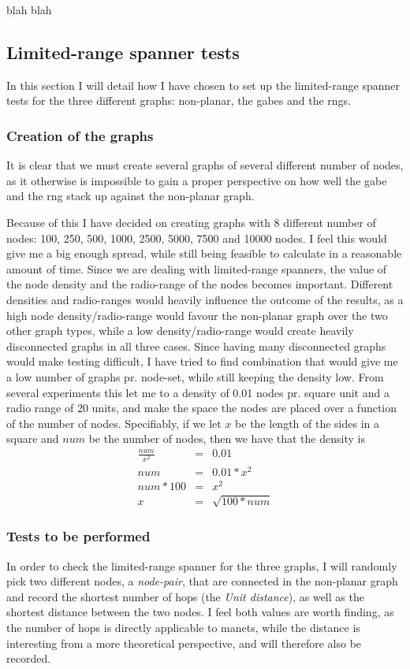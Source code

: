 blah blah



\subsection{Limited-range spanner tests}
\label{section:test_desc_spanners}
In this section I will detail how I have chosen to set up the limited-range spanner tests for the three different graphs: non-planar, the \acp{gabe} and the \acp{rng}.

\subsubsection{Creation of the graphs}
It is clear that we must create several graphs of several different number of nodes, as it otherwise is impossible to gain a proper perspective on how well the \ac{gabe} and the \ac{rng} stack up against the non-planar graph.

Because of this I have decided on creating graphs with 8 different number of nodes: 100, 250, 500, 1000, 2500, 5000, 7500 and 10000 nodes. I feel this would give me a big enough spread, while still being feasible to calculate in a reasonable amount of time. Since we are dealing with limited-range spanners, the value of the node density and the radio-range of the nodes becomes important. Different densities and radio-ranges would heavily influence the outcome of the results, as a high node density/radio-range would favour the non-planar graph over the two other graph types, while a low density/radio-range would create heavily disconnected graphs in all three cases. Since having many disconnected graphs would make testing difficult, I have tried to find combination that would give me a low number of graphs pr. node-set, while still keeping the density low. From several experiments this let me to a density of 0.01 nodes pr. square unit and a radio range of 20 units, and make the space the nodes are placed over a function of the number of nodes. Specifiably, if we let $x$ be the length of the sides in a square and $num$ be the number of nodes, then we have that the density is
\begin{eqnarray}
\frac{num}{x^2} &=& 0.01 \\
num &=& 0.01 * x^2 \\
num * 100 &=& x^2 \\
x &=& \sqrt{100 * num}  
\end{eqnarray}

\subsubsection{Tests to be performed}
In order to check the limited-range spanner for the three graphs, I will randomly pick two different nodes, a \emph{node-pair}, that are connected in the non-planar graph and record the shortest number of hops (the \emph{Unit distance}), as well as the shortest distance between the two nodes. I feel both values are worth finding, as the number of hops is directly applicable to \acp{manet}, while the distance is interesting from a more theoretical perspective, and will therefore also be recorded. 

